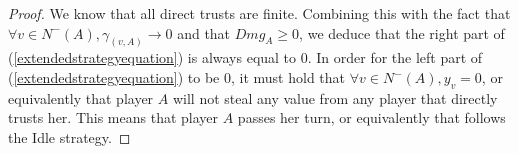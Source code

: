 \begin{proof}
  We know that all direct trusts are finite. Combining this with the fact that $\forall v \in N^{-}\left(A\right),
  \gamma_{\left(v, A\right)} \rightarrow 0$ and that $Dmg_A \geq 0$, we deduce that the right part of
  (\ref{extendedstrategyequation}) is always equal to 0. In order for the left part of (\ref{extendedstrategyequation}) to be
  0, it must hold that $\forall v \in N^{-}\left(A\right), y_v = 0$, or equivalently that player $A$ will not steal any value
  from any player that directly trusts her. This means that player $A$ passes her turn, or equivalently that follows the Idle
  strategy.
\end{proof}
